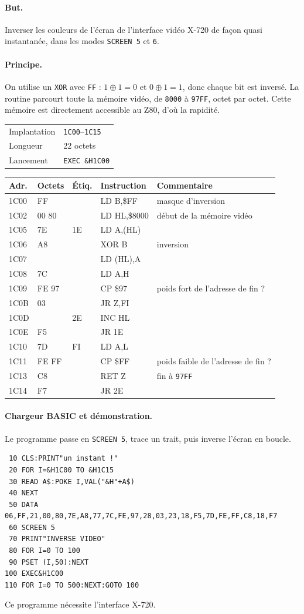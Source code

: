 \documentclass[a4paper,10pt]{article}
\makeatletter
\newcommand{\hex}[1]{\texttt{#1}}
\newcommand{\fiche}[3]{%
  \begin{center}\small
  \begin{tabular}{@{}ll@{}}
  \toprule
  Implantation & #1 \\
  Longueur & #2 \\
  Lancement & #3 \\
  \bottomrule
  \end{tabular}
  \end{center}}
\newenvironment{asm}
  {\small\begin{longtable}{@{}>{\ttfamily}l>{\ttfamily}l>{\ttfamily}l>{\ttfamily}l>{\raggedright\arraybackslash}p{6.2cm}@{}}
   \toprule
   \normalfont\bfseries Adr. & \normalfont\bfseries Octets & \normalfont\bfseries Étiq. & \normalfont\bfseries Instruction & \textbf{Commentaire}\\
   \midrule\endhead
   \bottomrule\endfoot}
  {\end{longtable}}
\makeatother
\begin{document}
\paragraph{But.} Inverser les couleurs de l'écran de l'interface vidéo X-720
de façon quasi instantanée, dans les modes \texttt{SCREEN 5} et \texttt{6}.

\paragraph{Principe.} On utilise un \texttt{XOR} avec \hex{FF} : $1 \oplus 1
= 0$ et $0 \oplus 1 = 1$, donc chaque bit est inversé. La routine parcourt
toute la mémoire vidéo, de \hex{8000} à \hex{97FF}, octet par octet. Cette
mémoire est directement accessible au Z80, d'où la rapidité.

\fiche{\hex{1C00}--\hex{1C15}}{22 octets}{\texttt{EXEC \&H1C00}}

\begin{asm}
1C00 & 06 FF    &    & LD B,\$FF      & masque d'inversion \\
1C02 & 21 00 80 &    & LD HL,\$8000   & début de la mémoire vidéo \\
1C05 & 7E       & 1E & LD A,(HL)      & \\
1C06 & A8       &    & XOR B          & inversion \\
1C07 & 77       &    & LD (HL),A      & \\
1C08 & 7C       &    & LD A,H         & \\
1C09 & FE 97    &    & CP \$97        & poids fort de l'adresse de fin ? \\
1C0B & 28 03    &    & JR Z,FI        & \\
1C0D & 23       & 2E & INC HL         & \\
1C0E & 18 F5    &    & JR 1E          & \\
1C10 & 7D       & FI & LD A,L         & \\
1C11 & FE FF    &    & CP \$FF        & poids faible de l'adresse de fin ? \\
1C13 & C8       &    & RET Z          & fin à \hex{97FF} \\
1C14 & 18 F7    &    & JR 2E          & \\
\end{asm}

\paragraph{Chargeur BASIC et démonstration.} Le programme passe en
\texttt{SCREEN 5}, trace un trait, puis inverse l'écran en boucle.
\begin{verbatim}
 10 CLS:PRINT"un instant !"
 20 FOR I=&H1C00 TO &H1C15
 30 READ A$:POKE I,VAL("&H"+A$)
 40 NEXT
 50 DATA 06,FF,21,00,80,7E,A8,77,7C,FE,97,28,03,23,18,F5,7D,FE,FF,C8,18,F7
 60 SCREEN 5
 70 PRINT"INVERSE VIDEO"
 80 FOR I=0 TO 100
 90 PSET (I,50):NEXT
100 EXEC&H1C00
110 FOR I=0 TO 500:NEXT:GOTO 100
\end{verbatim}
Ce programme nécessite l'interface X-720.
\end{document}
